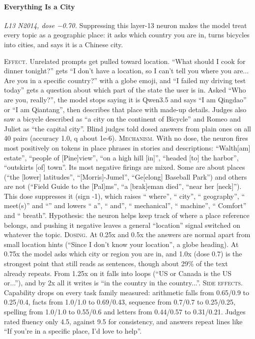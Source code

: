 \paragraph{Everything Is a City} \textit{L13 N2014, dose −0.70.} Suppressing this layer-13 neuron makes the model treat every topic as a geographic place: it asks which country you are in, turns bicycles into cities, and says it is a Chinese city.

\noindent\textsc{Effect.} Unrelated prompts get pulled toward location. “What should I cook for dinner tonight?” gets “I don't have a location, so I can't tell you where you are... Are you in a specific country?” with a globe emoji, and “I failed my driving test today” gets a question about which part of the state the user is in. Asked “Who are you, really?”, the model stops saying it is Qwen3.5 and says “I am Qingdao” or “I am Qiantang”, then describes that place with made-up details. Judges also saw a bicycle described as “a city on the continent of Bicycle” and Romeo and Juliet as “the capital city”. Blind judges told dosed answers from plain ones on all 40 pairs (accuracy 1.0, q about 1e-6). \textsc{Mechanism.} With no dose, the neuron fires most positively on tokens in place phrases in stories and descriptions: “Walth[am] estate”, “people of [Pine]view”, “on a high hill [in]”, “headed [to] the harbor”, “outskirts [of] town”. Its most negative firings are mixed. Some are about places (“the [lower] latitudes”, “[Morris]-Jumel”, “Ge[elong] Baseball Park”) and others are not (“Field Guide to the [Pal]ms”, “a [brak]eman died”, “near her [neck]”). This dose suppresses it (sign -1), which raises “ where”, “ city”, “ geography”, “ meet(s)” and “” and lowers “ a”, “ and”, “ mechanical”, “ machine”, “ Comfort” and “ breath”. Hypothesis: the neuron helps keep track of where a place reference belongs, and pushing it negative leaves a general “location” signal switched on whatever the topic. \textsc{Dosing.} At 0.25x and 0.5x the answers are normal apart from small location hints (“Since I don't know your location”, a globe heading). At 0.75x the model asks which city or region you are in, and 1.0x (dose 0.7) is the strongest point that still reads as sentences, though about 29\% of the text already repeats. From 1.25x on it falls into loops (“US or Canada is the US or...”), and by 2x all it writes is “in the country in the country...”. \textsc{Side effects.} Capability drops on every task family measured: arithmetic falls from 0.65/0.9 to 0.25/0.4, facts from 1.0/1.0 to 0.69/0.43, sequence from 0.7/0.7 to 0.25/0.25, spelling from 1.0/1.0 to 0.55/0.6 and letters from 0.44/0.57 to 0.31/0.21. Judges rated fluency only 4.5, against 9.5 for consistency, and answers repeat lines like “If you're in a specific place, I'd love to help”.


